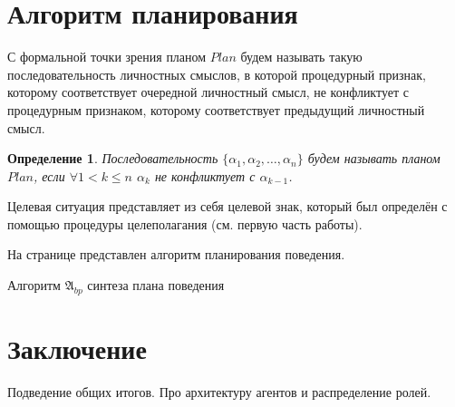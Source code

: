 \documentclass[a4paper, 12pt]{article}
\theoremstyle{plain}
\newtheorem{Def}{Определение}
\newcommand{\stretchsize}{2}
\renewcommand{\baselinestretch}{\stretchsize}
\begin{document}
	\section{Алгоритм планирования} С формальной точки зрения планом $Plan$ будем называть такую последовательность личностных смыслов, в которой процедурный признак, которому соответствует очередной личностный смысл, не конфликтует с процедурным признаком, которому соответствует предыдущий личностный смысл.
	
	\begin{Def}
		Последовательность $\{\alpha_1,\alpha_2,\dots,\alpha_n\}$ будем называть планом $Plan$, если $\forall 1<k\leqslant n$ $\alpha_k$ не конфликтует с $\alpha_{k-1}$.
	\end{Def}

	
	Целевая ситуация представляет из себя целевой знак, который был определён с помощью процедуры целеполагания (см. первую часть работы).
	
	На странице \pageref{alg:beh_plan} представлен алгоритм планирования поведения.
	\renewcommand{\baselinestretch}{1}	
	\begin{algorithm}[h]
		\caption{Алгоритм $\mathfrak{A}_{bp}$ синтеза плана поведения}\label{alg:beh_plan}
		\begin{algorithmic}[1]
			
		\end{algorithmic}
	\end{algorithm}
	\renewcommand{\baselinestretch}{\stretchsize}	

	\section*{Заключение} Подведение общих итогов. Про архитектуру агентов и распределение ролей.
	
	
	
	
\end{document}
